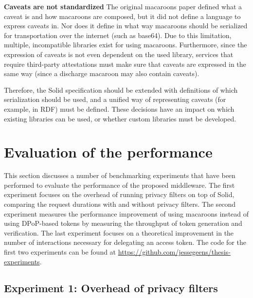 \noindent \textbf{Caveats are not standardized} The original macaroons paper defined what a caveat is and how macaroons are composed, but it did not define a language to express caveats in. Nor does it define in what way macaroons should be serialized for transportation over the internet (such as base64). Due to this limitation, multiple, incompatible libraries exist for using macaroons. Furthermore, since the expression of caveats is not even dependent on the used library, services that require third-party attestations must make sure that caveats are expressed in the same way (since a discharge macaroon may also contain caveats). 

\noindent Therefore, the Solid specification should be extended with definitions of which serialization should be used, and a unified way of representing caveats (for example, in \gls{RDF}) must be defined. These decisions have an impact on which existing libraries can be used, or whether custom libraries must be developed.


\section{Evaluation of the performance}
This section discusses a number of benchmarking experiments that have been performed to evaluate the performance of the proposed middleware. The first experiment focuses on the overhead of running privacy filters on top of Solid, comparing the request durations with and without privacy filters. The second experiment measures the performance improvement of using macaroons instead of using \gls{DPoP}-based tokens by measuring the throughput of token generation and verification. The last experiment focuses on a theoretical improvement in the number of interactions necessary for delegating an access token. The code for the first two experiments can be found at \url{https://github.com/jessegeens/thesis-experiments}.

\subsection{Experiment 1: Overhead of privacy filters}
\label{sec:privacy-filter-performance}
